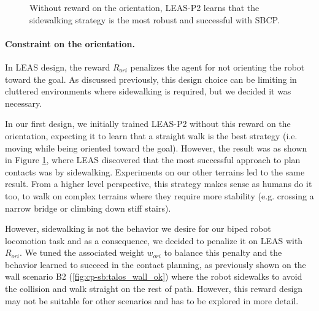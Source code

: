 \begin{figure}[h]
\begin{subfigure}[t]{0.19\linewidth}
    \end{subfigure}
    \caption{Without reward on the orientation, LEAS-P2 learns that the sidewalking strategy is the most robust and successful with SBCP.}
    \label{fig:cp-sb:sidewalk_seq}
\end{figure}


\paragraph{Constraint on the orientation.}
In LEAS design, the reward $R_{ori}$ penalizes the agent for not orienting the robot toward the goal. 
As discussed previously, this design choice can be limiting in cluttered environments where sidewalking is required, but we decided it was necessary.

In our first design, we initially trained LEAS-P2 without this reward on the orientation, expecting it to learn that a straight walk is the best strategy (i.e. moving while being oriented toward the goal). 
However, the result was as shown in Figure \ref{fig:cp-sb:sidewalk_seq}, where LEAS discovered that the most successful approach to plan contacts was by sidewalking.
Experiments on our other terrains led to the same result. 
From a higher level perspective, this strategy makes sense as humans do it too, to walk on complex terrains where they require more stability (e.g. crossing a narrow bridge or climbing down stiff stairs).

However, sidewalking is not the behavior we desire for our biped robot locomotion task and as a consequence, we decided to penalize it on LEAS with $R_{ori}$. We tuned the associated weight $w_{ori}$ to balance this penalty and the behavior learned to succeed in the contact planning, as previously shown on the wall scenario B2 (\ref{fig:cp-sb:talos_wall_ok}) where the robot sidewalks to avoid the collision and walk straight on the rest of path. However, this reward design may not be suitable for other scenarios and has to be explored in more detail.

